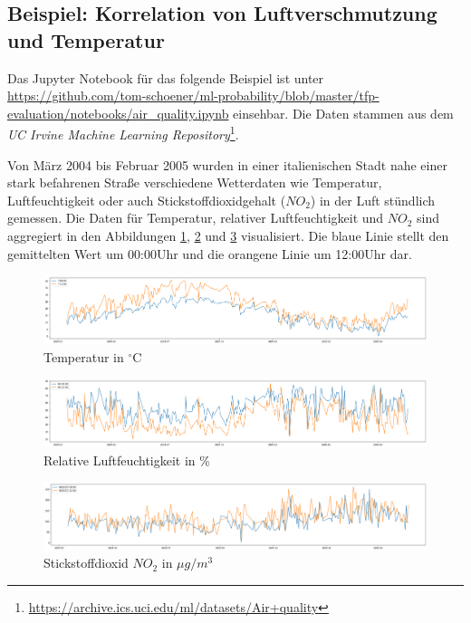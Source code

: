 \documentclass[12pt]{article}
\begin{document}
\subsection{Beispiel: Korrelation von Luftverschmutzung und Temperatur}
\label{sec:example_air_quality}

Das Jupyter Notebook für das folgende Beispiel ist unter \url{https://github.com/tom-schoener/ml-probability/blob/master/tfp-evaluation/notebooks/air_quality.ipynb} einsehbar. Die Daten stammen aus dem \textit{UC Irvine Machine Learning Repository}\footnote{\url{https://archive.ics.uci.edu/ml/datasets/Air+quality}}.

Von März 2004 bis Februar 2005 wurden in einer italienischen Stadt nahe einer stark befahrenen Straße verschiedene Wetterdaten wie Temperatur, Luftfeuchtigkeit oder auch Stickstoffdioxidgehalt ($NO_2$) in der Luft stündlich gemessen. Die Daten für Temperatur, relativer Luftfeuchtigkeit und $NO_2$ sind aggregiert in den Abbildungen \ref{fig:temp}, \ref{fig:rh} und \ref{fig:no2} visualisiert. Die blaue Linie stellt den gemittelten Wert um 00:00Uhr und die orangene Linie um 12:00Uhr dar.

\newpage

\begin{figure}[h]
    \centering
    \includegraphics[width=1.0\textwidth]{./figs/temp.png}
    \caption{Temperatur in $^\circ\text{C}$}
    \label{fig:temp}
\end{figure}

\begin{figure}[h]
    \centering
    \includegraphics[width=1.0\textwidth]{./figs/rh.png}
    \caption{Relative Luftfeuchtigkeit in \%}
    \label{fig:rh}
\end{figure}

\begin{figure}[h]
    \centering
    \includegraphics[width=1.0\textwidth]{./figs/no2.png}
    \caption{Stickstoffdioxid $NO_2$ in ${\mu g/m^3}$}
    \label{fig:no2}
\end{figure}
\end{document}
